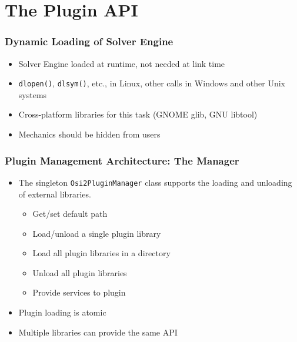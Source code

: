 \documentclass{beamer}
\begin{document}
\section{The Plugin API}

\begin{frame}
  \frametitle{Dynamic Loading of Solver Engine}
  \begin{itemize}
  \item Solver Engine loaded at runtime, not needed at link time
  \item \lstinline|dlopen()|, \lstinline|dlsym()|, etc., in Linux, other
    calls in Windows and other Unix systems
  \item Cross-platform libraries for this task (GNOME glib, GNU
    libtool)
  \item Mechanics should be hidden from users
  \end{itemize}
\end{frame}

\begin{frame}
  \frametitle{Plugin Management Architecture: The Manager}
  \begin{itemize}
  \item The singleton \lstinline|Osi2PluginManager| class supports
    the loading and unloading of external libraries.
    \begin{itemize}
    \item Get/set default path
    \item Load/unload a single plugin library
    \item Load all plugin libraries in a directory
    \item Unload all plugin libraries
    \item Provide services to plugin
    \end{itemize}
  \item Plugin loading is atomic
  \item Multiple libraries can provide the same API
  \end{itemize}
\end{frame}
\end{document}
